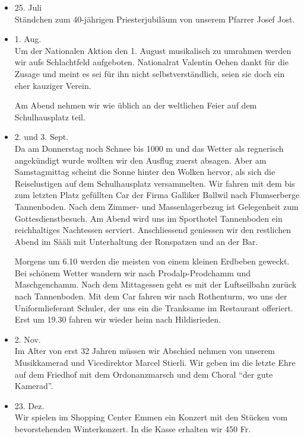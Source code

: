 \begin{multicols}{2}
\begin{itemize}
        \item[]25. Juli\\
        Ständchen zum 40-jährigen Priesterjubiläum von unserem Pfarrer Josef
        Jost.

        \item[]1. Aug.\\
        Um der Nationalen Aktion den 1. August musikalisch zu umrahmen werden
        wir aufs Schlachtfeld aufgeboten. Nationalrat Valentin Oehen dankt für
        die Zusage und meint es sei für ihn nicht selbstverständlich, seien sie
        doch ein eher kauziger Verein.

        Am Abend nehmen wir wie üblich an der weltlichen Feier auf dem
        Schulhausplatz teil.

        \item[]2. und 3. Sept.\\
        Da am Donnerstag noch Schnee bis 1000 m und das Wetter als regnerisch
        angekündigt wurde wollten wir den Ausflug zuerst absagen. Aber am
        Samstagmittag scheint die Sonne hinter den Wolken hervor, als sich die
        Reiselustigen auf dem Schulhausplatz versammelten. Wir fahren mit dem
        bis zum letzten Platz gefüllten Car der Firma Galliker Ballwil nach
        Flumserberge Tannenboden. Nach dem Zimmer- und Massenlagerbezug ist
        Gelegenheit zum Gottesdienstbesuch. Am Abend wird uns im Sporthotel
        Tannenboden ein reichhaltiges Nachtessen serviert. Anschliessend
        geniessen wir den restlichen Abend im Sääli mit Unterhaltung der
        Ronspatzen und an der Bar.

        Morgens um 6.10 werden die meisten von einem kleinen Erdbeben geweckt.
        Bei schönem Wetter wandern wir nach Prodalp-Prodchamm und Maschgenchamm.
        Nach dem Mittagessen geht es mit der Luftseilbahn zurück nach
        Tannenboden. Mit dem Car fahren wir nach Rothenturm, wo uns der
        Uniformlieferant Schuler, der uns ein die Tranksame im Restaurant
        offeriert. Erst um 19.30 fahren wir wieder heim nach Hildisrieden.

        \item[]2. Nov.\\
        Im Alter von erst 32 Jahren müssen wir Abschied nehmen von unserem
        Musikkamerad und Vicedirektor Marcel Stierli. Wir geben im die letzte
        Ehre auf dem Friedhof mit dem Ordonanzmarsch und dem Choral \enquote{der gute
            Kamerad}.

        \item[]23. Dez.\\
        Wir spielen im Shopping Center Emmen ein Konzert mit den Stücken vom
        bevorstehenden Winterkonzert. In die Kasse erhalten wir 450 Fr.

    \end{itemize}

\end{multicols}

